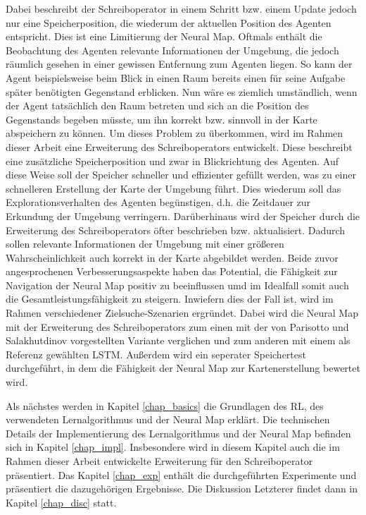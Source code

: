 Dabei beschreibt der Schreiboperator in einem Schritt bzw. einem Update jedoch nur eine Speicherposition, die wiederum der aktuellen Position des Agenten entspricht. Dies ist eine Limitierung der Neural Map. Oftmals enthält die Beobachtung des Agenten relevante Informationen der Umgebung, die jedoch räumlich gesehen in einer gewissen Entfernung zum Agenten liegen. So kann der Agent beispielsweise beim Blick in einen Raum bereits einen für seine Aufgabe später benötigten Gegenstand erblicken. Nun wäre es ziemlich umständlich, wenn der Agent tatsächlich den Raum betreten und sich an die Position des Gegenstands begeben müsste, um ihn korrekt bzw. sinnvoll in der Karte abspeichern zu können. Um dieses Problem zu überkommen, wird im Rahmen dieser Arbeit eine Erweiterung des Schreiboperators entwickelt. Diese beschreibt eine zusätzliche Speicherposition und zwar in Blickrichtung des Agenten. Auf diese Weise soll der Speicher schneller und effizienter gefüllt werden, was zu einer schnelleren Erstellung der Karte der Umgebung führt. Dies wiederum soll das Explorationsverhalten des Agenten begünstigen, d.h. die Zeitdauer zur Erkundung der Umgebung verringern. Darüberhinaus wird der Speicher durch die Erweiterung des Schreiboperators öfter beschrieben bzw. aktualisiert. Dadurch sollen relevante Informationen der Umgebung mit einer größeren Wahrscheinlichkeit auch korrekt in der Karte abgebildet werden. Beide zuvor angesprochenen Verbesserungsaspekte haben das Potential, die Fähigkeit zur Navigation der Neural Map positiv zu beeinflussen umd im Idealfall somit auch die Gesamtleistungsfähigkeit zu steigern. Inwiefern dies der Fall ist, wird im Rahmen verschiedener Zielsuche-Szenarien ergründet. Dabei wird die Neural Map mit der Erweiterung des Schreiboperators zum einen mit der von Parisotto und Salakhutdinov vorgestellten Variante verglichen und zum anderen mit einem als Referenz gewählten LSTM. Außerdem wird ein seperater Speichertest durchgeführt, in dem die Fähigkeit der Neural Map zur Kartenerstellung bewertet wird.

Als nächstes werden in Kapitel \ref{chap_basics} die Grundlagen des RL, des verwendeten Lernalgorithmus und der Neural Map erklärt. Die technischen Details der Implementierung des Lernalgorithmus und der Neural Map befinden sich in Kapitel \ref{chap_impl}. Insbesondere wird in diesem Kapitel auch die im Rahmen dieser Arbeit entwickelte Erweiterung für den Schreiboperator präsentiert. Das Kapitel \ref{chap_exp} enthält die durchgeführten Experimente und präsentiert die dazugehörigen Ergebnisse. Die Diskussion Letzterer findet dann in Kapitel \ref{chap_disc} statt.

















